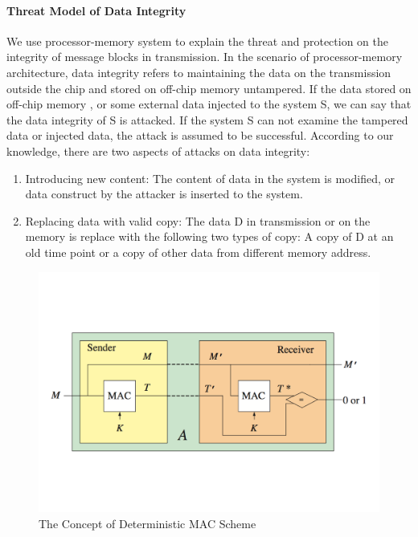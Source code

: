 \documentclass{article}
\begin{document}
\paragraph{Threat Model of Data Integrity}
We use processor-memory system to explain the threat and protection on the integrity of message blocks in transmission. 
In the scenario of processor-memory architecture, data integrity refers to maintaining the data on the transmission outside the chip and stored on off-chip memory untampered. If the data stored on off-chip memory , or some external data injected to the system S, we can say that the data integrity of S is attacked. If the system S can not examine the tampered data or injected data, the attack is assumed to be successful. According to our knowledge, there are two aspects of attacks on data integrity:
\begin{enumerate}
	\item Introducing new content: The content of data in the system is modified, or data construct by the attacker is inserted to the system.
	\item Replacing data with valid copy: The data D in transmission or on the memory is replace with the following two types of copy: A copy of D at an old time point or a copy of other data from different memory address.
\end{enumerate}
\begin{figure}[htbp]
\centering
\includegraphics[scale=0.4]{./diagrams/MAC.pdf}
\caption{The Concept of Deterministic MAC Scheme}
\label{fig:deterministic_mac}
\end{figure}
\end{document}
